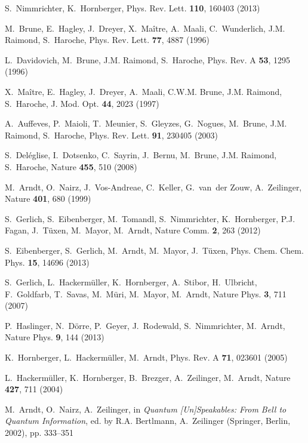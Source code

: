 \documentclass[aps,pra,reprint,amsmath,amssymb,showpacs,nofootinbib,floatfix,onecolumn,12pt]{revtex4-1}
\begin{document}
\begin{thebibliography}{100}
S.~Nimmrichter, K.~Hornberger, Phys. Rev. Lett. \textbf{110}, 160403 (2013)

M.~Brune, E.~Hagley, J.~Dreyer, X.~Ma{\^i}tre, A.~Maali, C.~Wunderlich, J.M.
  Raimond, S.~Haroche, Phys. Rev. Lett. \textbf{77}, 4887 (1996)

L.~Davidovich, M.~Brune, J.M. Raimond, S.~Haroche, Phys. Rev. A \textbf{53},
  1295 (1996)

X.~Ma{\^i}tre, E.~Hagley, J.~Dreyer, A.~Maali, C.W.M. Brune, J.M. Raimond,
  S.~Haroche, J. Mod. Opt. \textbf{44}, 2023 (1997)

A.~Auffeves, P.~Maioli, T.~Meunier, S.~Gleyzes, G.~Nogues, M.~Brune, J.M.
  Raimond, S.~Haroche, Phys. Rev. Lett. \textbf{91}, 230405 (2003)

S.~Del{\'e}glise, I.~Dotsenko, C.~Sayrin, J.~Bernu, M.~Brune, J.M. Raimond,
  S.~Haroche, Nature \textbf{455}, 510 (2008)

M.~Arndt, O.~Nairz, J.~Vos-Andreae, C.~Keller, G.~van~der Zouw, A.~Zeilinger,
  Nature \textbf{401}, 680 (1999)

S.~Gerlich, S.~Eibenberger, M.~Tomandl, S.~Nimmrichter, K.~Hornberger, P.J.
  Fagan, J.~T{\"u}xen, M.~Mayor, M.~Arndt, Nature Comm. \textbf{2}, 263 (2012)

S.~Eibenberger, S.~Gerlich, M.~Arndt, M.~Mayor, J.~T{\"u}xen, Phys. Chem. Chem.
  Phys. \textbf{15}, 14696 (2013)

S.~Gerlich, L.~Hackerm{\"u}ller, K.~Hornberger, A.~Stibor, H.~Ulbricht,
  F.~Goldfarb, T.~Savas, M.~M{\"u}ri, M.~Mayor, M.~Arndt, Nature Phys.
  \textbf{3}, 711 (2007)

P.~Haslinger, N.~D{\"o}rre, P.~Geyer, J.~Rodewald, S.~Nimmrichter, M.~Arndt,
  Nature Phys. \textbf{9}, 144 (2013)

K.~Hornberger, L.~Hackerm{\"u}ller, M.~Arndt, Phys. Rev. A \textbf{71}, 023601
  (2005)

L.~Hackerm{\"u}ller, K.~Hornberger, B.~Brezger, A.~Zeilinger, M.~Arndt, Nature
  \textbf{427}, 711 (2004)

M.~Arndt, O.~Nairz, A.~Zeilinger, in \emph{Quantum [Un]Speakables: From Bell to
  Quantum Information}, ed. by R.A. Bertlmann, A.~Zeilinger (Springer, Berlin,
  2002), pp. 333--351


\end{thebibliography}
\end{document}
